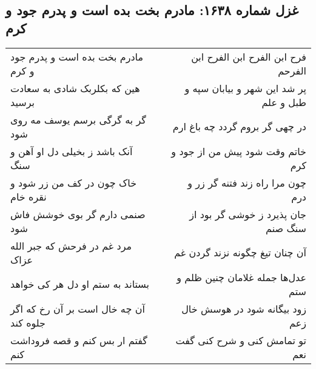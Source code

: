 \begin{center}
\section*{غزل شماره ۱۶۳۸: مادرم بخت بده است و پدرم جود و کرم}
\label{sec:1638}
\begin{longtable}{l p{0.5cm} r}
مادرم بخت بده است و پدرم جود و کرم
&&
فرح ابن الفرح ابن الفرح ابن الفرحم
\\
هین که بکلربک شادی به سعادت برسید
&&
پر شد این شهر و بیابان سپه و طبل و علم
\\
گر به گرگی برسم یوسف مه روی شود
&&
در چهی گر بروم گردد چه باغ ارم
\\
آنک باشد ز بخیلی دل او آهن و سنگ
&&
خاتم وقت شود پیش من از جود و کرم
\\
خاک چون در کف من زر شود و نقره خام
&&
چون مرا راه زند فتنه گر زر و درم
\\
صنمی دارم گر بوی خوشش فاش شود
&&
جان پذیرد ز خوشی گر بود از سنگ صنم
\\
مرد غم در فرحش که جبر الله عزاک
&&
آن چنان تیغ چگونه نزند گردن غم
\\
بستاند به ستم او دل هر کی خواهد
&&
عدل‌ها جمله غلامان چنین ظلم و ستم
\\
آن چه خال است بر آن رخ که اگر جلوه کند
&&
زود بیگانه شود در هوسش خال زعم
\\
گفتم ار بس کنم و قصه فروداشت کنم
&&
تو تمامش کنی و شرح کنی گفت نعم
\\
\end{longtable}
\end{center}
